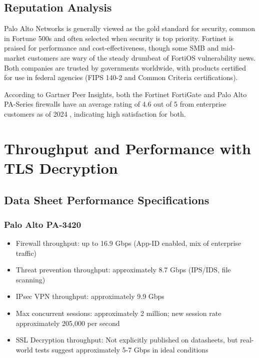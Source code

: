 \documentclass[12pt]{article}
\begin{document}
\subsection{Reputation Analysis}

Palo Alto Networks is generally viewed as the gold standard for security, common in Fortune 500s and often selected when security is top priority. Fortinet is praised for performance and cost-effectiveness, though some SMB and mid-market customers are wary of the steady drumbeat of FortiOS vulnerability news. Both companies are trusted by governments worldwide, with products certified for use in federal agencies (FIPS 140-2 and Common Criteria certifications).

According to Gartner Peer Insights, both the Fortinet FortiGate and Palo Alto PA-Series firewalls have an average rating of 4.6 out of 5 from enterprise customers as of 2024 \cite{gartnerpeer2024}, indicating high satisfaction for both.

\section{Throughput and Performance with TLS Decryption}

\subsection{Data Sheet Performance Specifications}

\subsubsection{Palo Alto PA-3420}
\begin{itemize}
    \item Firewall throughput: up to 16.9 Gbps (App-ID enabled, mix of enterprise traffic) \cite{pa3400datasheet}
    \item Threat prevention throughput: approximately 8.7 Gbps (IPS/IDS, file scanning) \cite{pa3400datasheet}
    \item IPsec VPN throughput: approximately 9.9 Gbps \cite{pa3400datasheet}
    \item Max concurrent sessions: approximately 2 million; new session rate approximately 205,000 per second \cite{pa3400datasheet}
    \item SSL Decryption throughput: Not explicitly published on datasheets, but real-world tests suggest approximately 5-7 Gbps in ideal conditions
\end{itemize}
\end{document}
